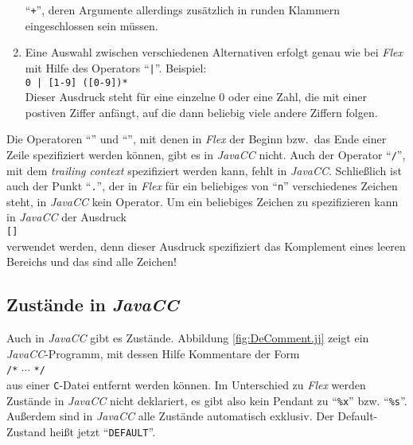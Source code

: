 \begin{enumerate}
      ``\texttt{+}'', deren Argumente allerdings zus\"atzlich in runden Klammern
      eingeschlossen sein m\"ussen.
\item Eine Auswahl zwischen verschiedenen Alternativen erfolgt genau wie bei \textsl{Flex}\/
      mit Hilfe des Operators ``\texttt{|}''.  Beispiel:
      \\[0.2cm]
      \hspace*{1.3cm}
      \texttt{0 | [1-9] ([0-9])*}
      \\[0.2cm]       
      Dieser Ausdruck steht f\"ur eine einzelne 0 oder eine Zahl, die mit einer
      postiven Ziffer anf\"angt, auf die dann beliebig viele andere Ziffern folgen.
\end{enumerate}
Die Operatoren ``\texttt{}'' und ``\texttt{}'', mit denen in \textsl{Flex}\/
der Beginn bzw.~das Ende einer Zeile spezifiziert werden k\"onnen, gibt es in
\textsl{JavaCC}\/ nicht.  Auch der Operator ``\texttt{/}'', mit dem \emph{trailing context}
spezifiziert werden kann, fehlt in \textsl{JavaCC}.  Schlie{\ss}lich ist auch der Punkt
``\texttt{.}'', der in \textsl{Flex}\/ f\"ur ein beliebiges von ``\texttt{n}''
verschiedenes Zeichen steht, in \textsl{JavaCC}\/ kein Operator.  Um ein beliebiges Zeichen
zu spezifizieren kann in \textsl{JavaCC}\/ der Ausdruck
\\[0.2cm]
\hspace*{1.3cm}
\texttt{[]}
\\[0.2cm]
verwendet werden, denn dieser Ausdruck spezifiziert das Komplement eines leeren Bereichs
und das sind alle Zeichen!

\subsection{Zust\"ande in \textsl{JavaCC}}
Auch in \textsl{JavaCC}\/ gibt es Zust\"ande.  Abbildung \ref{fig:DeComment.jj} zeigt
ein \textsl{JavaCC}-Programm, mit dessen Hilfe Kommentare der Form
\\[0.2cm]
\hspace*{1.3cm}
\texttt{/*} $\cdots$ \texttt{*/}
\\[0.2cm]
aus einer \texttt{C}-Datei entfernt werden k\"onnen.  Im Unterschied zu \textsl{Flex}\/
werden Zust\"ande in \textsl{JavaCC}\/ nicht deklariert, es gibt also kein Pendant zu
``\texttt{\%x}'' bzw. ``\texttt{\%s}''.  
Au{\ss}erdem sind in \textsl{JavaCC}\/ alle Zust\"ande automatisch exklusiv.  Der Default-Zustand
hei{\ss}t jetzt ``\texttt{DEFAULT}''.

